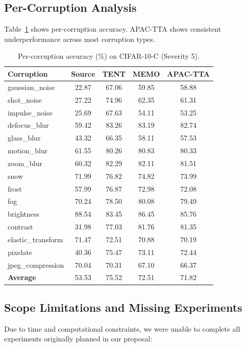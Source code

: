 \documentclass{article}
\begin{document}
\subsection{Per-Corruption Analysis}

Table~\ref{tab:per_corruption} shows per-corruption accuracy. APAC-TTA shows consistent underperformance across most corruption types.

\begin{table}[t]
\caption{Per-corruption accuracy (\%) on CIFAR-10-C (Severity 5).}
\label{tab:per_corruption}
\centering
\small
\begin{tabular}{lcccc}
\toprule
Corruption & Source & TENT & MEMO & APAC-TTA \\
\midrule
gaussian\_noise & 22.87 & 67.06 & 59.85 & 58.88 \\
shot\_noise & 27.22 & 74.96 & 62.35 & 61.31 \\
impulse\_noise & 25.69 & 67.63 & 54.11 & 53.25 \\
defocus\_blur & 59.42 & 83.26 & 83.19 & 82.74 \\
glass\_blur & 43.32 & 66.35 & 58.11 & 57.53 \\
motion\_blur & 61.55 & 80.26 & 80.83 & 80.33 \\
zoom\_blur & 60.32 & 82.29 & 82.11 & 81.51 \\
snow & 71.99 & 76.82 & 74.82 & 73.99 \\
frost & 57.99 & 76.87 & 72.98 & 72.08 \\
fog & 70.24 & 78.50 & 80.08 & 79.49 \\
brightness & 88.54 & 83.45 & 86.45 & 85.76 \\
contrast & 31.98 & 77.03 & 81.76 & 81.35 \\
elastic\_transform & 71.47 & 72.51 & 70.88 & 70.19 \\
pixelate & 40.36 & 75.47 & 73.11 & 72.44 \\
jpeg\_compression & 70.04 & 70.31 & 67.10 & 66.37 \\
\midrule
\textbf{Average} & 53.53 & 75.52 & 72.51 & 71.82 \\
\bottomrule
\end{tabular}
\end{table}

\subsection{Scope Limitations and Missing Experiments}

Due to time and computational constraints, we were unable to complete all experiments originally planned in our proposal:
\end{document}
